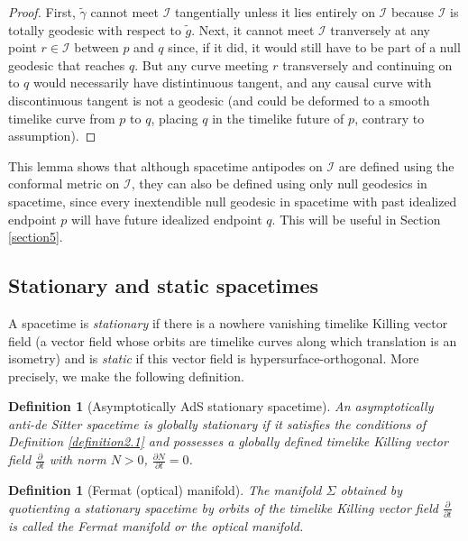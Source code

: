 \documentclass[12pt]{amsart}
\numberwithin{equation}{section}
\newtheorem{definition}[theorem]{Definition}
\begin{document}
\begin{proof}
First, ${\tilde \gamma}$ cannot meet ${\mathcal I}$ tangentially unless it lies entirely on ${\mathcal I}$ because ${\mathcal I}$ is totally geodesic with respect to ${\tilde g}$. Next, it cannot meet ${\mathcal I}$ tranversely at any point $r\in {\mathcal I}$ between $p$ and $q$ since, if it did, it would still have to be part of a null geodesic that reaches $q$. But any curve meeting $r$ transversely and continuing on to $q$ would necessarily have distintinuous tangent, and any causal curve with discontinuous tangent is not a geodesic (and could be deformed to a smooth timelike curve from $p$ to $q$, placing $q$ in the timelike future of $p$, contrary to assumption).
\end{proof}

This lemma shows that although spacetime antipodes on ${\mathcal I}$ are defined using the conformal metric on ${\mathcal I}$, they can also be defined using only null geodesics in spacetime, since every inextendible null geodesic in spacetime with past idealized endpoint $p$ will have future idealized endpoint $q$. This will be useful in Section \ref{section5}.

\subsection{Stationary and static spacetimes}\label{subsection2.2}
A spacetime is \emph{stationary} if there is a nowhere vanishing timelike Killing vector field (a vector field whose orbits are timelike curves along which translation is an isometry) and is \emph{static} if this vector field is hypersurface-orthogonal. More precisely, we make the following definition.

\begin{definition}[Asymptotically AdS stationary spacetime]\label{definition2.3}
An asymptotically anti-de Sitter spacetime is \emph{globally stationary} if it satisfies the conditions of Definition \ref{definition2.1} and possesses a globally defined timelike Killing vector field $\frac{\partial}{\partial t}$ with norm $N>0$, $\frac{\partial N}{\partial t}=0$.
\end{definition}

\begin{definition}[Fermat (optical) manifold]\label{definition2.4}
The manifold $\Sigma$ obtained by quotienting a stationary spacetime by orbits of the timelike Killing vector field $\frac{\partial}{\partial t}$ is called the \emph{Fermat manifold} or the \emph{optical manifold}.
\end{definition}
\end{document}
